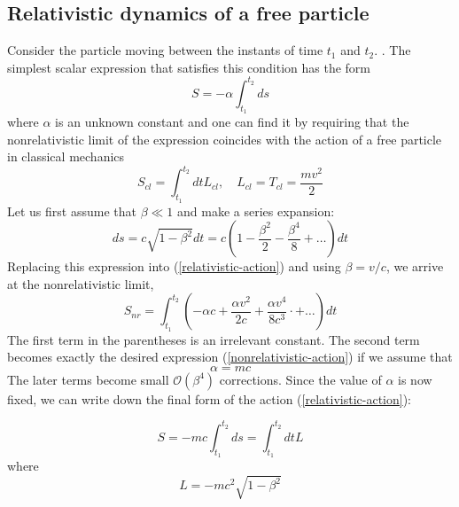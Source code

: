 \subsection{Relativistic dynamics of a free particle}
Consider the particle moving between the instants of time $t_{1}$ and $t_{2} .$ . The simplest scalar expression that satisfies this condition has the form
\begin{equation}
S=-\alpha \int_{t_{1}}^{t_{2}} d s
\label{relativistic-action}
\end{equation}
where $\alpha$ is an unknown constant and one can find it by requiring that the nonrelativistic limit of the expression coincides with the action of a free particle in classical mechanics
\begin{equation}
S_{c l}=\int_{t_{1}}^{t_{2}} d t L_{c l}, \quad L_{c l}=T_{c l}=\frac{m v^{2}}{2}
\label{nonrelativistic-action}
\end{equation}
Let us first assume that $\beta\ll1$ and make a series expansion:
\begin{equation}
d s=c \sqrt{1-\beta^{2}} d t=c\left(1-\frac{\beta^{2}}{2}-\frac{\beta^{4}}{8}+\ldots\right) d t
\end{equation}
Replacing this expression into (\ref{relativistic-action}) and using $\beta=v/c$, we arrive at the nonrelativistic limit,
\begin{equation}
S_{n r}=\int_{t_{1}}^{t_{2}}\left(-\alpha c+\frac{\alpha v^{2}}{2 c}+\frac{\alpha v^{4}}{8 c^{3}} \cdot+\ldots\right) d t
\end{equation}
The first term in the parentheses is an irrelevant constant. The second term becomes exactly the desired expression (\ref{nonrelativistic-action}) if we assume that 
$$
\alpha=mc
$$
The later terms become small $\mathcal{O}\left(\beta^{4}\right)$ corrections. Since the value of $\alpha$ is now fixed, we can write down the final form of the action (\ref{relativistic-action}):
\begin{qt}
    \begin{equation}
S=-m c \int_{t_{1}}^{t_{2}} d s=\int_{t_{1}}^{t_{2}} d t L
\end{equation}
where
\begin{equation}
L=-m c^{2} \sqrt{1-\beta^{2}}
\label{lagrange-function}
\end{equation}
\end{qt}
